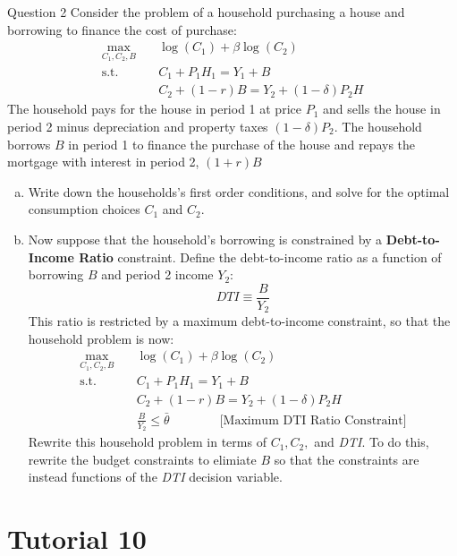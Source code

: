 \documentclass[a4paper]{article}
\begin{document}
	\begin{questionbox}{Question 2}
		Consider the problem of a household purchasing a house and borrowing to finance the cost of purchase:
		\begin{align*}
			\max_{C_1,C_2,B}\quad &\log (C_1) +\beta\log(C_2)\\
			\text{s.t.}\quad &C_1+P_1H_1=Y_1+B\\
			& C_2 + (1-r)B = Y_2+(1-\delta) P_2H
		\end{align*}
		The household pays for the house in period 1 at price \( P_1 \) and sells the house in period 2 minus depreciation and property taxes \( (1-\delta)P_2 \). The household borrows \( B \) in period 1 to finance the purchase of the house and repays the mortgage with interest in period 2, \( (1+r)B \)
		\begin{enumerate}[(a)]
			\item Write down the households's first order conditions, and solve for the optimal consumption choices \( C_1 \) and \( C_2 \).
			\item Now suppose that the household's borrowing is constrained by a \textbf{Debt-to-Income Ratio} constraint. Define the debt-to-income ratio as a function of borrowing \( B \) and period 2 income \( Y_2 \):
			\[
				DTI \equiv \frac{B}{Y_2}
			\]
			This ratio is restricted by a maximum debt-to-income constraint, so that the household problem is now:
			\begin{align*}
				\max_{C_1,C_2,B}\quad &\log (C_1) +\beta\log(C_2)\\
				\text{s.t.}\quad &C_1+P_1H_1=Y_1+B\\
				& C_2 + (1-r)B = Y_2+(1-\delta) P_2H\\
				& \frac{B}{Y_2} \leq \bar{\theta} \qquad\qquad \text{[Maximum DTI Ratio Constraint]}
			\end{align*}
			Rewrite this household problem in terms of \( C_1,C_2, \) and \textit{DTI}. To do this, rewrite the budget constraints to elimiate \( B \) so that the constraints are instead functions of the \textit{DTI} decision variable.
		\end{enumerate}
	\end{questionbox}
\section{Tutorial 10}\pagebreak
\end{document}
